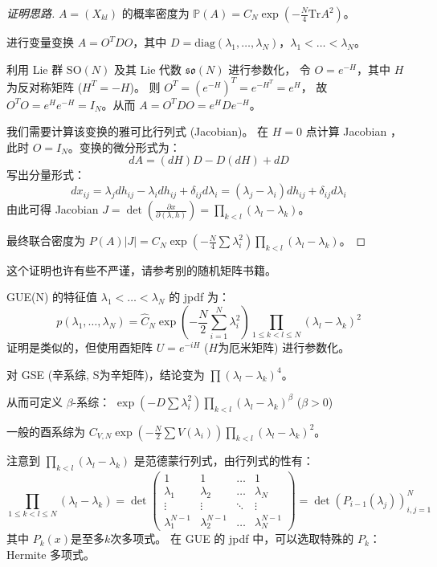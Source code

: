 \begin{proof}[证明思路]
$A=(X_{kl})$ 的概率密度为 $\mathbb{P}(A) = C_N \exp(-\frac{N}{4} \text{Tr} A^2)$。

进行变量变换 $A=O^TDO$，其中 $D=\text{diag}(\lambda_1, \dots, \lambda_N)$，$\lambda_1 < \dots < \lambda_N$。

利用 Lie 群 $\mathrm{SO}(N)$ 及其 Lie 代数 $\mathfrak{so}(N)$ 进行参数化，
令 $O = e^{-H}$，其中 $H$ 为反对称矩阵 ($H^T=-H$)。
则 $O^T = (e^{-H})^T = e^{-H^T} = e^H$，
故 $O^TO = e^H e^{-H} = I_N$。从而 $A=O^TDO = e^HDe^{-H}$。

我们需要计算该变换的雅可比行列式 (Jacobian)。
在 $H=0$ 点计算 Jacobian ，此时 $O=I_N$。变换的微分形式为：
\[ dA = (dH)D - D(dH) + dD \]
写出分量形式： 
\[ dx_{ij} = \lambda_j dh_{ij} - \lambda_i dh_{ij} + \delta_{ij} d\lambda_i = (\lambda_j - \lambda_i) dh_{ij} + \delta_{ij} d\lambda_i \]
由此可得 Jacobian $J = \det(\frac{\partial x}{\partial (\lambda, h)}) = \prod\limits_{k<l} (\lambda_l - \lambda_k)$。

最终联合密度为 $P(A) |J| = C_N \exp(-\frac{N}{4}\sum \lambda_i^2) \prod\limits_{k<l}(\lambda_l - \lambda_k)$。
\end{proof}
\begin{remark}
    这个证明也许有些不严谨，请参考别的随机矩阵书籍。
\end{remark}
\begin{theorem}
GUE(N) 的特征值 $\lambda_1 < \dots < \lambda_N$ 的 jpdf 为：
\[ p(\lambda_1, \dots, \lambda_N) = \hat{C}_N \exp\left(-\frac{N}{2}\sum_{i=1}^N\lambda_i^2\right)\prod_{1 \le k < l \le N}(\lambda_l-\lambda_k)^2 \]
证明是类似的，但使用酉矩阵 $U=e^{-iH}$ ($H$为厄米矩阵) 进行参数化。
\end{theorem}

\begin{remark}[$\beta$-系综]
对 GSE (辛系综, S为辛矩阵)，结论变为 $\prod(\lambda_l-\lambda_k)^4$。

从而可定义 $\beta$-系综：
$\exp(-D\sum \lambda_i^2) \prod\limits_{k<l}(\lambda_l-\lambda_k)^\beta$ ($\beta>0$)

一般的酉系综为 $C_{V,N} \exp(-\frac{N}{2} \sum V(\lambda_i)) \prod\limits_{k<l}(\lambda_l-\lambda_k)^2$。
\end{remark}

\begin{remark}
注意到 $\prod\limits_{k<l}(\lambda_l-\lambda_k)$ 是范德蒙行列式，由行列式的性有：
\[ \prod_{1 \le k < l \le N}(\lambda_l - \lambda_k) = \det 
\begin{pmatrix}
1 & 1 & \dots & 1 \\
\lambda_1 & \lambda_2 & \dots & \lambda_N \\
\vdots & \vdots & \ddots & \vdots \\
\lambda_1^{N-1} & \lambda_2^{N-1} & \dots & \lambda_N^{N-1}
\end{pmatrix}
= \det(P_{i-1}(\lambda_j))_{i,j=1}^N
\]
其中 $P_k(x)$是至多$k$次多项式。
在 GUE 的 jpdf 中，可以选取特殊的 $P_k$：Hermite 多项式。
\end{remark}

